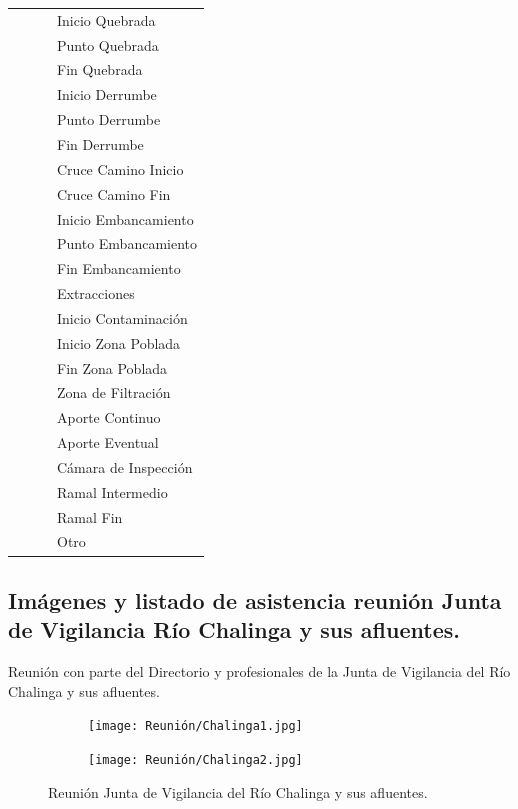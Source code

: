 \documentclass[]{article}
\begin{document}
\begin{longtable}{|p{3cm}|p{3.5cm}|p{3.5cm}|p{3.5cm}|}
    & & & Inicio Quebrada\\ \cline{4-4}
    & & & Punto Quebrada\\ \cline{4-4}
    & & & Fin Quebrada\\ \cline{4-4}
    & & & Inicio Derrumbe\\ \cline{4-4}
    & & & Punto Derrumbe\\ \cline{4-4}
    & & & Fin Derrumbe\\ \cline{4-4}
    & & & Cruce Camino Inicio\\ \cline{4-4}
    & & & Cruce Camino Fin\\ \cline{4-4}
    & & & Inicio Embancamiento\\ \cline{4-4}
    & & & Punto Embancamiento\\ \cline{4-4}
    & & & Fin Embancamiento\\ \cline{4-4}
    & & & Extracciones\\ \cline{4-4}
    & & & Inicio Contaminación\\ \cline{4-4}
    & & & Inicio Zona Poblada\\ \cline{4-4}
    & & & Fin Zona Poblada\\ \cline{4-4}
    & & & Zona de Filtración\\ \cline{4-4}
    & & & Aporte Continuo\\ \cline{4-4}
    & & & Aporte Eventual\\ \cline{4-4}
    & & & Cámara de Inspección\\ \cline{4-4}
    & & & Ramal Intermedio\\ \cline{4-4}
    & & & Ramal Fin\\ \cline{4-4}
    & & & Otro\\ \cline{2-4}
    \end{longtable}

\newpage
\subsection{Imágenes y listado de asistencia reunión Junta de Vigilancia Río Chalinga y sus afluentes.} \label{fotos_reunión}

Reunión con parte del Directorio y profesionales de la Junta de Vigilancia del Río Chalinga y sus afluentes.

\begin{figure}[H]
  \centering
\begin{subfigure}{.45\textwidth}
\hfill
  \texttt{[image: Reunión/Chalinga1.jpg]}
\end{subfigure}
\hfill
\begin{subfigure}{.45\textwidth}
\hfill
  \texttt{[image: Reunión/Chalinga2.jpg]} 
\end{subfigure}
\caption{Reunión Junta de Vigilancia del Río Chalinga y sus afluentes.}
\end{figure}
\end{document}
